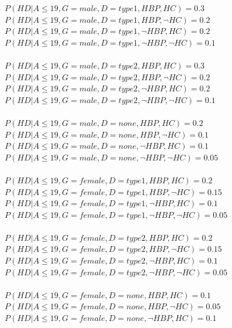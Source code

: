 \documentclass{article}
\begin{document}
$P(HD | A \leq 19, G = male, D = type1, HBP, HC) = 0.3 $\\
$P(HD | A \leq 19, G = male, D = type1, HBP, \neg HC) = 0.2$\\
$P(HD | A \leq 19, G = male, D = type1, \neg HBP, HC) = 0.2$\\
$P(HD | A \leq 19, G = male, D = type1, \neg HBP, \neg HC) = 0.1$\\
\\
$P(HD | A \leq 19, G = male, D = type2, HBP, HC) = 0.3 $\\
$P(HD | A \leq 19, G = male, D = type2, HBP, \neg HC) = 0.2$\\
$P(HD | A \leq 19, G = male, D = type2, \neg HBP, HC) = 0.2$\\
$P(HD | A \leq 19, G = male, D = type2, \neg HBP, \neg HC) = 0.1$\\
\\
$P(HD | A \leq 19, G = male, D = none, HBP, HC) = 0.2 $\\
$P(HD | A \leq 19, G = male, D = none, HBP, \neg HC) = 0.1$\\
$P(HD | A \leq 19, G = male, D = none, \neg HBP, HC) = 0.1$\\
$P(HD | A \leq 19, G = male, D = none, \neg HBP, \neg HC) = 0.05$\\
\\
$P(HD | A \leq 19, G = female, D = type1, HBP, HC) = 0.2 $\\
$P(HD | A \leq 19, G = female, D = type1, HBP, \neg HC) = 0.15$\\
$P(HD | A \leq 19, G = female, D = type1, \neg HBP, HC) = 0.1$\\
$P(HD | A \leq 19, G = female, D = type1, \neg HBP, \neg HC) = 0.05$\\
\\
$P(HD | A \leq 19, G = female, D = type2, HBP, HC) = 0.2 $\\
$P(HD | A \leq 19, G = female, D = type2, HBP, \neg HC) = 0.15$\\
$P(HD | A \leq 19, G = female, D = type2, \neg HBP, HC) = 0.1$\\
$P(HD | A \leq 19, G = female, D = type2, \neg HBP, \neg HC) = 0.05$\\
\\
$P(HD | A \leq 19, G = female, D = none, HBP, HC) = 0.1 $\\
$P(HD | A \leq 19, G = female, D = none, HBP, \neg HC) = 0.05$\\
$P(HD | A \leq 19, G = female, D = none, \neg HBP, HC) = 0.1$\\
\end{document}
